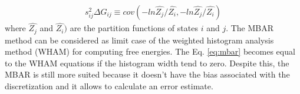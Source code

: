 \begin{equation}
\label{eq:varmbar}
\begin{aligned}
 s_{ij}^{2} \Delta G_{ij} \equiv cov (-ln \hat{Z_{j}}/\hat{Z_{i}},-ln \hat{Z_{j}}/\hat{Z_{i}})
\end{aligned}
\end{equation}
where $\hat{Z_{j}}$ and $\hat{Z_{i}})$ are the partition functions of states $i$ and $j$. The MBAR method can be considered as limit case of the 
weighted histogram analysis method (WHAM) \cite{wham} for computing free energies. The Eq. \eqref{eq:mbar} becomes equal to the WHAM equations if the histogram width tend to zero. Despite this, the MBAR is still more suited because it doesn't have the bias associated with the discretization  and it allows to calculate an error estimate.

